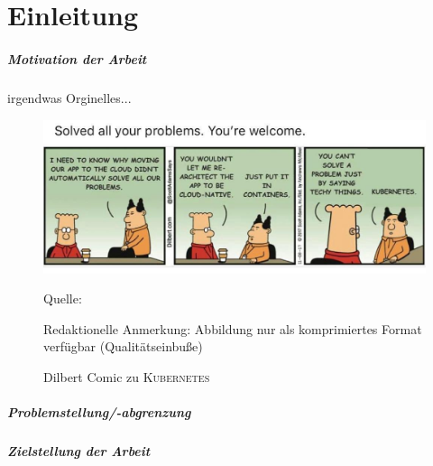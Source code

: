 \acresetall 
{} %
\chapter{Einleitung}
\paragraph{Motivation der Arbeit}
irgendwas Orginelles...
\begin{figure}[H]
	\centering
	\includegraphics[scale=0.33]{img/dilbertCloud.jpeg}
	\caption{Dilbert Comic zu \textsc{Kubernetes}}
	{\footnotesize Quelle: \cite{DilbertKubernetes}\par}
	{\footnotesize Redaktionelle Anmerkung: Abbildung nur als komprimiertes Format verfügbar (Qualitätseinbuße)}
\end{figure}

\paragraph{Problemstellung/-abgrenzung}

\paragraph{Zielstellung der Arbeit}

